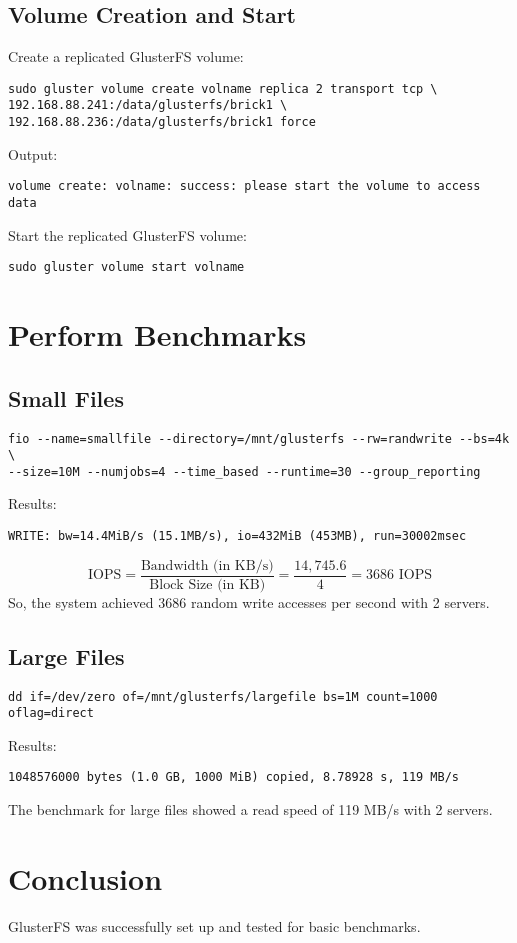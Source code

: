 \documentclass[a4paper,12pt]{article}
\begin{document}
\subsection{Volume Creation and Start}
Create a replicated GlusterFS volume:
\begin{lstlisting}
sudo gluster volume create volname replica 2 transport tcp \
192.168.88.241:/data/glusterfs/brick1 \
192.168.88.236:/data/glusterfs/brick1 force
\end{lstlisting}
Output:
\begin{lstlisting}
volume create: volname: success: please start the volume to access data
\end{lstlisting}
Start the replicated GlusterFS volume:
\begin{lstlisting}
sudo gluster volume start volname
\end{lstlisting}

\section{Perform Benchmarks}

\subsection{Small Files}
\begin{lstlisting}
fio --name=smallfile --directory=/mnt/glusterfs --rw=randwrite --bs=4k \
--size=10M --numjobs=4 --time_based --runtime=30 --group_reporting
\end{lstlisting}
Results: 
\begin{lstlisting}
WRITE: bw=14.4MiB/s (15.1MB/s), io=432MiB (453MB), run=30002msec
\end{lstlisting}
\begin{equation}
\text{IOPS} = \frac{\text{Bandwidth (in KB/s)}}{\text{Block Size (in KB)}} = \frac{14,745.6}{4} = 3686 \text{ IOPS}
\end{equation}
So, the system achieved 3686 random write accesses per second with 2 servers.

\subsection{Large Files}
\begin{lstlisting}
dd if=/dev/zero of=/mnt/glusterfs/largefile bs=1M count=1000 oflag=direct
\end{lstlisting}
Results:
\begin{lstlisting}
1048576000 bytes (1.0 GB, 1000 MiB) copied, 8.78928 s, 119 MB/s
\end{lstlisting}
The benchmark for large files showed a read speed of 119 MB/s with 2 servers.

\section{Conclusion}
GlusterFS was successfully set up and tested for basic benchmarks.
\end{document}
